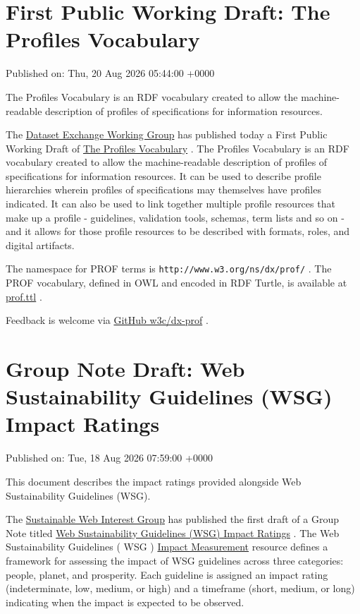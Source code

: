 \documentclass[11pt,a4paper]{article}
\begin{document}
\section{First Public Working Draft: The Profiles Vocabulary}

Published on: Thu, 20 Aug 2026 05:44:00 +0000

The Profiles Vocabulary is an RDF vocabulary created to allow the machine-readable description of profiles of specifications for information resources.

The \href{https://www.w3.org/groups/wg/dx}{Dataset Exchange Working Group} has published today a First Public Working Draft of \href{https://www.w3.org/TR/2026/WD-dx-prof-1.0-20260820/}{The Profiles Vocabulary} . The Profiles Vocabulary is an RDF vocabulary created to allow the machine-readable description of profiles of specifications for information resources. It can be used to describe profile hierarchies wherein profiles of specifications may themselves have profiles indicated. It can also be used to link together multiple profile resources that make up a profile - guidelines, validation tools, schemas, term lists and so on - and it allows for those profile resources to be described with formats, roles, and digital artifacts.

The namespace for PROF terms is \texttt{http://www.w3.org/ns/dx/prof/} .
The PROF vocabulary, defined in OWL and encoded in RDF Turtle, is available at \href{https://www.w3.org/TR/2026/WD-dx-prof-1.0-20260820/rdf/prof.ttl}{prof.ttl} .

Feedback is welcome via \href{https://github.com/w3c/dx-prof/}{GitHub w3c/dx-prof} .

\section{Group Note Draft: Web Sustainability Guidelines (WSG) Impact Ratings}

Published on: Tue, 18 Aug 2026 07:59:00 +0000

This document describes the impact ratings provided alongside Web Sustainability Guidelines (WSG).

The \href{https://www.w3.org/groups/ig/sustainableweb}{Sustainable Web Interest Group} has published the first draft of a Group Note titled \href{https://www.w3.org/TR/2026/DNOTE-wsg-ir-20260818/}{Web Sustainability Guidelines (WSG) Impact Ratings} . The Web Sustainability Guidelines ( WSG ) \href{https://w3c.github.io/sustainableweb-impact}{Impact Measurement} resource defines a framework for assessing the impact of WSG guidelines across three categories: people, planet, and prosperity. Each guideline is assigned an impact rating (indeterminate, low, medium, or high) and a timeframe (short, medium, or long) indicating when the impact is expected to be observed.
\end{document}
